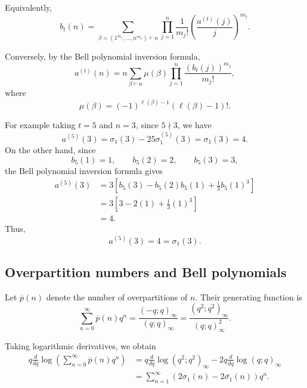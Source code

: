 \documentclass[12pt,oneside,reqno]{amsart}
\numberwithin{equation}{section}
\begin{document}
	Equivalently,
	\[
	b_t(n)
	=
	\sum_{\beta=(1^{m_1},\ldots,n^{m_n})\vdash n}
	\prod_{j=1}^{n}
	\frac{1}{m_j!}
	\left(
	\frac{a^{(t)}(j)}{j}
	\right)^{m_j}.
	\]
	
	Conversely, by the Bell polynomial inversion formula,
	\[
	a^{(t)}(n)
	=
	n
	\sum_{\beta\vdash n}
	\mu(\beta)
	\prod_{j=1}^{n}
	\frac{\left(b_t(j)\right)^{m_j}}{m_j!},
	\]
	where
	\[
	\mu(\beta)
	=
	(-1)^{\ell(\beta)-1}
	(\ell(\beta)-1)!.
	\]
	
	For example taking $t=5$ and $n=3$, since $5\nmid3$, we have
	\[
	a^{(5)}(3)
	=
	\sigma_1(3)
	-
	25\sigma_1^{(5)}(3)
	=
	\sigma_1(3)
	=
	4.
	\]
	On the other hand, since
	\[
	b_5(1)=1,\qquad b_5(2)=2,\qquad b_5(3)=3,
	\]
	the Bell polynomial inversion formula gives
	\[
	\begin{aligned}
		a^{(5)}(3)
		&=
		3\left[
		b_5(3)
		-b_5(2)b_5(1)
		+\frac{1}{3}b_5(1)^3
		\right]\\
		&=
		3\left[
		3-2(1)+\frac{1}{3}(1)^3
		\right]\\
		&=4.
	\end{aligned}
	\]
	Thus,
	\[
	a^{(5)}(3)=4=\sigma_1(3).
	\]
	\subsection{Overpartition numbers and Bell polynomials}
	
	Let $\overline{p}(n)$ denote the number of overpartitions of $n$. Their
	generating function is
	\begin{equation}
		\sum_{n=0}^{\infty}\overline{p}(n)q^n
		=
		\frac{(-q;q)_\infty}{(q;q)_\infty}
		=
		\frac{(q^2;q^2)_\infty}{(q;q)_\infty^2}.
		\label{eq:overGF}
	\end{equation}
	
	Taking logarithmic derivatives, we obtain
	\begin{align*}
		q\frac{d}{dq}
		\log
		\left(
		\sum_{n=0}^{\infty}
		\overline{p}(n)q^n
		\right)
		&=
		q\frac{d}{dq}\log(q^2;q^2)_\infty
		-
		2q\frac{d}{dq}\log(q;q)_\infty \\
		&=
		\sum_{n=1}^{\infty}
		\left(
		2\sigma_1(n)
		-
		2\bar{\sigma_1}(n)\right)q^n.
	\end{align*}
	
\end{document}
